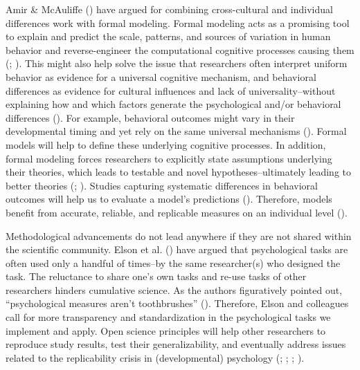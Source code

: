 \documentclass[
]{scrbook}
\begin{document}
Amir \& McAuliffe () have argued for combining cross-cultural and individual differences work with formal modeling. Formal modeling acts as a promising tool to explain and predict the scale, patterns, and sources of variation in human behavior and reverse-engineer the computational cognitive processes causing them (; ). This might also help solve the issue that researchers often interpret uniform behavior as evidence for a universal cognitive mechanism, and behavioral differences as evidence for cultural influences and lack of universality\thinspace --\thinspace without explaining how and which factors generate the psychological and/or behavioral differences (). For example, behavioral outcomes might vary in their developmental timing and yet rely on the same universal mechanisms (). Formal models will help to define these underlying cognitive processes. In addition, formal modeling forces researchers to explicitly state assumptions underlying their theories, which leads to testable and novel hypotheses\thinspace --\thinspace ultimately leading to better theories (; ). Studies capturing systematic differences in behavioral outcomes will help us to evaluate a model's predictions (). Therefore, models benefit from accurate, reliable, and replicable measures on an individual level ().

Methodological advancements do not lead anywhere if they are not shared within the scientific community. Elson et al. () have argued that psychological tasks are often used only a handful of times\thinspace --\thinspace by the same researcher(s) who designed the task. The reluctance to share one's own tasks and re-use tasks of other researchers hinders cumulative science. As the authors figuratively pointed out, ``psychological measures aren't toothbrushes'' (). Therefore, Elson and colleagues call for more transparency and standardization in the psychological tasks we implement and apply. Open science principles will help other researchers to reproduce study results, test their generalizability, and eventually address issues related to the replicability crisis in (developmental) psychology (; ; ; ).
\end{document}
